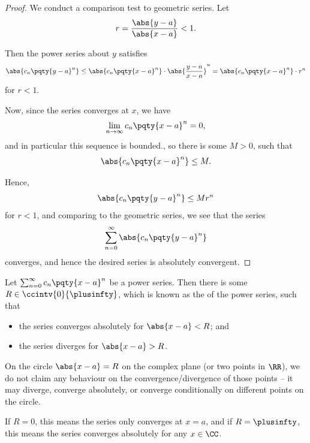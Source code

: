 \begin{proof}
    We conduct a comparison test to geometric series. Let
    \[
        r = \frac{\abs{y - a}}{\abs{x - a}} < 1.
    \]

    Then the power series about \(y\) satisfies
    \[
        \abs{c_n \pqty{y - a}^{n}} \leq \abs{c_n \pqty{x - a}^{n}} \cdot \abs{\frac{y - a}{x - a}}^n = \abs{c_n \pqty{x - a}^{n}} \cdot r^n
    \]
    for \(r < 1\).

    Now, since the series converges at \(x\), we have
    \[
        \lim_{n \to \infty} c_n \pqty{x - a}^{n} = 0,
    \]
    and in particular this sequence is bounded., so there is some \(M > 0\), such that
    \[
        \abs{c_n \pqty{x - a}^{n}} \leq M.
    \]

    Hence,
    \[
        \abs{c_n \pqty{y - a}^n} \leq M r^n
    \]
    for \(r < 1\), and comparing to the geometric series, we see that the series
    \[
        \sum_{n = 0}^{\infty} \abs{c_n \pqty{y - a}^{n}}
    \]
    converges, and hence the desired series is absolutely convergent.
\end{proof}

\begin{proposition}
    \label{prop:existence-radius-convergence}%
    Let \(\sum_{n = 0}^{\infty} c_n \pqty{x - a}^{n}\) be a power series. Then there is some \(R \in \ccintv{0}{\plusinfty}\), which is known as the  of the power series, such that
    \begin{itemize}
        \item the series converges absolutely for \(\abs{x - a} < R\); and
        \item the series diverges for \(\abs{x - a} > R\).
    \end{itemize}
\end{proposition}

\begin{remark}
    On the circle \(\abs{x - a} = R\) on the complex plane (or two points in \(\RR\)), we do not claim any behaviour on the convergence/divergence of those points -- it may diverge, converge absolutely, or converge conditionally on different points on the circle.
\end{remark}

If \(R = 0\), this means the series only converges at \(x = a\), and if \(R = \plusinfty\), this means the series converges absolutely for any \(x \in \CC\).

